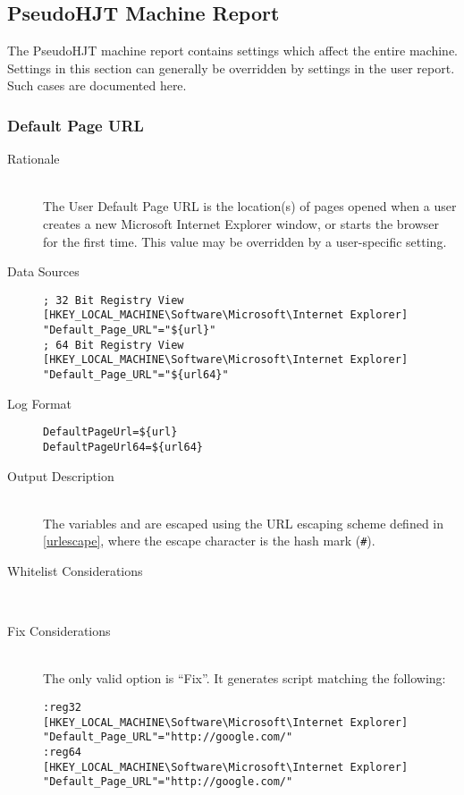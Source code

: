 \subsection{PseudoHJT Machine Report}
The PseudoHJT machine report contains settings which affect the entire machine.
Settings in this section can generally be overridden by settings in the user
report. Such cases are documented here.

\subsubsection{Default Page URL}
\begin{description}
\item[Rationale] \hfill \\
The User Default Page URL is the location(s) of pages opened when a user creates
a new Microsoft Internet Explorer window, or starts the browser for the first
time. This value may be overridden by a user-specific setting.

\item[Data Sources] \hfill
\vspace{-\baselineskip}
\begin{verbatim}
; 32 Bit Registry View
[HKEY_LOCAL_MACHINE\Software\Microsoft\Internet Explorer]
"Default_Page_URL"="${url}"
; 64 Bit Registry View
[HKEY_LOCAL_MACHINE\Software\Microsoft\Internet Explorer]
"Default_Page_URL"="${url64}"
\end{verbatim}
\item[Log Format] \hfill
\vspace{-\baselineskip}
\begin{verbatim} 
DefaultPageUrl=${url}
DefaultPageUrl64=${url64}
\end{verbatim}
\item[Output Description] \hfill \\
The variables  and  are escaped using the URL escaping
scheme defined in \ref{urlescape}, where the escape character is the hash mark
(\verb|#|).
\item[Whitelist Considerations] \hfill \\

\item[Fix Considerations] \hfill \\
The only valid option is ``Fix''. It generates script matching the following:
\vspace{-\baselineskip}
\begin{verbatim}
:reg32
[HKEY_LOCAL_MACHINE\Software\Microsoft\Internet Explorer]
"Default_Page_URL"="http://google.com/"
:reg64
[HKEY_LOCAL_MACHINE\Software\Microsoft\Internet Explorer]
"Default_Page_URL"="http://google.com/"
\end{verbatim}
\end{description}

